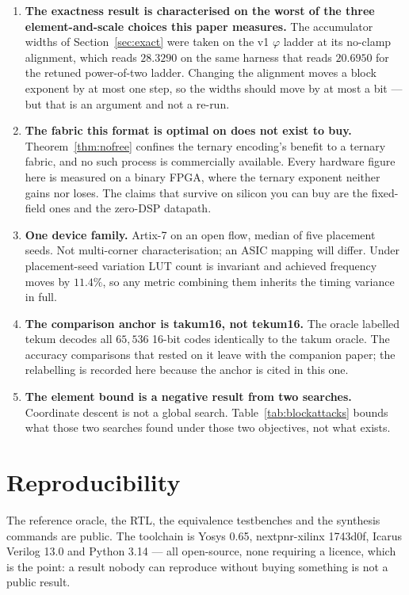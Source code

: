\documentclass[11pt]{article}
\theoremstyle{definition}
\begin{document}
\begin{enumerate}[leftmargin=*]
\item \textbf{The exactness result is characterised on the worst of the three
element-and-scale choices this paper measures.} The accumulator widths of
Section~\ref{sec:exact} were taken on the v1 $\varphi$ ladder at its no-clamp
alignment, which reads $28.3290$ on the same harness that reads $20.6950$ for the
retuned power-of-two ladder. Changing the alignment moves a block exponent by at
most one step, so the widths should move by at most a bit --- but that is an
argument and not a re-run.

\item \textbf{The fabric this format is optimal on does not exist to buy.}
Theorem~\ref{thm:nofree} confines the ternary encoding's benefit to a ternary
fabric, and no such process is commercially available. Every hardware figure here
is measured on a binary FPGA, where the ternary exponent neither gains nor loses.
The claims that survive on silicon you can buy are the fixed-field ones and the
zero-DSP datapath.

\item \textbf{One device family.} Artix-7 on an open flow, median of five
placement seeds. Not multi-corner characterisation; an ASIC mapping will differ.
Under placement-seed variation LUT count is invariant and achieved frequency
moves by $11.4\%$, so any metric combining them inherits the timing variance in
full.

\item \textbf{The comparison anchor is takum16, not tekum16.} The oracle labelled
tekum decodes all $65{,}536$ 16-bit codes identically to the takum oracle. The
accuracy comparisons that rested on it leave with the companion paper; the
relabelling is recorded here because the anchor is cited in this one.

\item \textbf{The element bound is a negative result from two searches.}
Coordinate descent is not a global search. Table~\ref{tab:blockattacks} bounds
what those two searches found under those two objectives, not what exists.
\end{enumerate}

\section*{Reproducibility}

The reference oracle, the RTL, the equivalence testbenches and the synthesis
commands are public. The toolchain is Yosys 0.65, nextpnr-xilinx 1743d0f,
Icarus Verilog 13.0 and Python 3.14 --- all open-source, none requiring a
licence, which is the point: a result nobody can reproduce without buying
something is not a public result.
\end{document}
